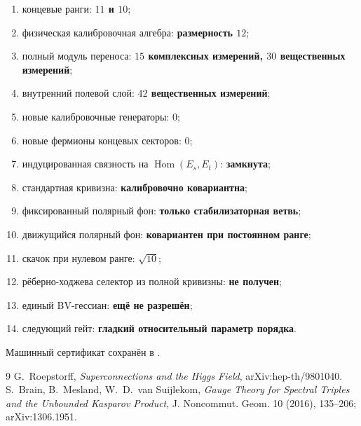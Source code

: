 \begin{protocol}
\begin{enumerate}
 \item концевые ранги: \textbf{$11$ и $10$};
 \item физическая калибровочная алгебра: \textbf{размерность $12$};
 \item полный модуль переноса: \textbf{$15$ комплексных измерений, $30$ вещественных измерений};
 \item внутренний полевой слой: \textbf{$42$ вещественных измерений};
 \item новые калибровочные генераторы: \textbf{$0$};
 \item новые фермионы концевых секторов: \textbf{$0$};
 \item индуцированная связность на $\operatorname{Hom}(E_s,E_t)$:
 \textbf{замкнута};
 \item стандартная кривизна: \textbf{калибровочно ковариантна};
 \item фиксированный полярный фон: \textbf{только стабилизаторная ветвь};
 \item движущийся полярный фон: \textbf{ковариантен при постоянном ранге};
 \item скачок при нулевом ранге: \textbf{$\sqrt{10}$};
 \item рёберно-ходжева селектор из полной кривизны: \textbf{не получен};
 \item единый BV-гессиан: \textbf{ещё не разрешён};
 \item следующий гейт: \textbf{гладкий относительный параметр порядка}.
\end{enumerate}
\end{protocol}

Машинный сертификат сохранён в
.

\begin{thebibliography}{9}
G.~Roepstorff,
\emph{Superconnections and the Higgs Field},
arXiv:hep-th/9801040.
S.~Brain, B.~Mesland, W.~D.~van Suijlekom,
\emph{Gauge Theory for Spectral Triples and the Unbounded Kasparov Product},
J. Noncommut. Geom. 10 (2016), 135--206; arXiv:1306.1951.
\end{thebibliography}